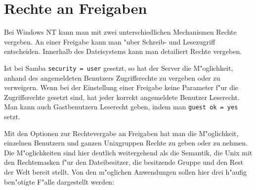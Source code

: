 \documentclass{scrartcl}\usepackage{pslatex}\typearea{12}
\newcommand{\param}{\texttt}
\begin{document}
\section{Rechte an Freigaben}
\label{freigaberechte}

Bei Windows NT kann man mit zwei unterschiedlichen Mechanismen Rechte
vergeben. An einer Freigabe kann man "uber Schreib- und Lesezugriff
entscheiden. Innerhalb des Dateisystems kann man detailiert Rechte
vergeben.

Ist bei Samba \param{security = user} gesetzt, so hat der Server die
M"oglichkeit, anhand des angemeldeten Benutzers Zugriffsrechte zu
vergeben oder zu verweigern. Wenn bei der Einstellung einer Freigabe
keine Parameter f"ur die Zugriffsrechte gesetzt sind, hat jeder
korrekt angemeldete Benutzer Leserecht. Man kann auch Gastbenutzern
Leserecht geben, indem man \param{guest ok = yes} setzt.

Mit den Optionen zur Rechtevergabe an Freigaben hat man die
M"oglichkeit, einzelnen Benutzern und ganzen Unixgruppen Rechte zu
geben oder zu nehmen. Die M"oglichkeiten sind hier deutlich weitergehend 
als die Semantik, die Unix mit den Rechtemasken f"ur den
Dateibesitzer, die besitzende Gruppe und den Rest der Welt bereit
stellt. Von den m"oglichen Anwendungen sollen hier drei h"aufig
ben"otigte F"alle dargestellt werden:
\end{document}
